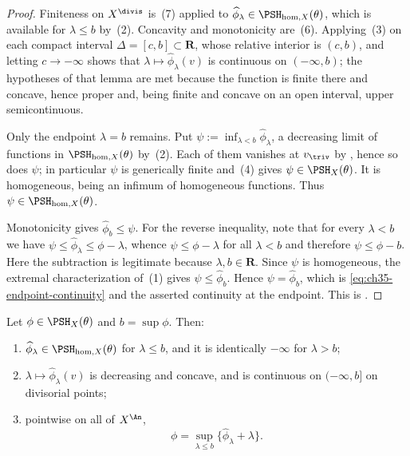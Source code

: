 \begin{proof}
Finiteness on $X^{\divis}$ is \,(7) applied to
$\widehat\phi_\lambda\in\PSH_{\mathrm{hom},X}(\theta)$, which is available
for $\lambda\leq b$ by \,(2).  Concavity
and monotonicity are \,(6).  Applying
\,(3) on each compact interval
$\Delta=[c,b]\subset\mathbf R$, whose relative interior is $(c,b)$, and
letting $c\to-\infty$ shows that
$\lambda\mapsto\widehat\phi_\lambda(v)$ is continuous on
$(-\infty,b)$; the hypotheses of that lemma are met because the function
is finite there and concave, hence proper and, being finite and concave on
an open interval, upper semicontinuous.

Only the endpoint $\lambda=b$ remains.  Put
$\psi:=\inf_{\lambda<b}\widehat\phi_\lambda$, a decreasing limit of
functions in $\PSH_{\mathrm{hom},X}(\theta)$ by
\,(2).  Each of them vanishes at
$v_{\triv}$ by , hence so does
$\psi$; in particular $\psi$ is generically finite and
\,(4) gives $\psi\in\PSH_X(\theta)$.  It is
homogeneous, being an infimum of homogeneous functions.  Thus
$\psi\in\PSH_{\mathrm{hom},X}(\theta)$.

Monotonicity gives $\widehat\phi_b\leq\psi$.  For the reverse
inequality, note that for every $\lambda<b$ we have
$\psi\leq\widehat\phi_\lambda\leq\phi-\lambda$, whence
$\psi\leq\phi-\lambda$ for all $\lambda<b$ and therefore
$\psi\leq\phi-b$.  Here the subtraction is legitimate because
$\lambda,b\in\mathbf R$.  Since $\psi$ is homogeneous, the extremal
characterization of \,(1) gives
$\psi\leq\widehat\phi_b$.  Hence $\psi=\widehat\phi_b$, which is
\eqref{eq:ch35-endpoint-continuity} and the asserted continuity at the
endpoint.  This is \cite[Lemma~6.23]{BJ22}.
\end{proof}

\begin{theorem}\label{thm:homogeneous-legendre-decomposition}
Let $\phi\in\PSH_X(\theta)$ and $b=\sup\phi$.  Then:
\begin{enumerate}
\item $\widehat\phi_\lambda\in
      \PSH_{\mathrm{hom},X}(\theta)$ for $\lambda\leq b$, and it is
      identically $-\infty$ for $\lambda>b$;
\item $\lambda\mapsto\widehat\phi_\lambda(v)$ is decreasing and concave,
      and is continuous on $(-\infty,b]$ on divisorial points;
\item pointwise on all of $X^{\An}$,
\begin{equation}
\label{eq:legendre-reconstruction-bj}
                   \phi=\sup_{\lambda\leq b}
                         \{\widehat\phi_\lambda+\lambda\}.
\end{equation}
\end{enumerate}
\par
\end{theorem}

